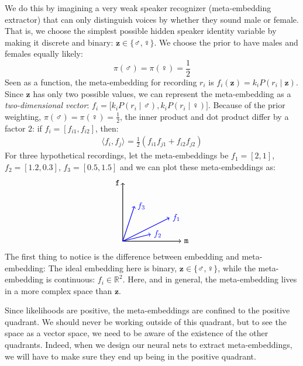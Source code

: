 \documentclass[a4paper,oneside,12pt,english]{report}
\def\zvec{\mathbf{z}}
\def\expv#1#2{\bigl\langle#1\bigr\rangle_{#2}}
\def\R{\mathbb{R}}
\def\dot#1#2{\expv{#1,#2}{}}
\begin{document}
We do this by imagining a very weak speaker recognizer (meta-embedding extractor) that can only distinguish voices by whether they sound male or female. That is, we choose the simplest possible hidden speaker identity variable by making it discrete and binary: $\zvec\in\{\male,\female\}$. We choose the prior to have males and females equally likely:  
$$\pi(\male)=\pi(\female)=\frac12$$ 
Seen as a function, the meta-embedding for recording $r_i$ is $f_i(\zvec) = k_i P(r_i\mid\zvec)$. Since $\zvec$ has only two possible values, we can represent the meta-embedding as a \emph{two-dimensional vector}: $f_i = \bigl[k_iP(r_i\mid\male),k_iP(r_i\mid\female)\bigr]$. Because of the prior weighting, $\pi(\male)=\pi(\female)=\frac12$, the inner product and dot product differ by a factor $2$: if $f_i=[f_{i1},f_{i2}]$, then:
\begin{align}
\dot{f_i}{f_j} = \frac12(f_{i1}f_{j1} + f_{i2}f_{j2})
\end{align}
For three hypothetical recordings, let the meta-embeddings be $f_1=[2,1]$, $f_2=[1.2,0.3]$, $f_3=[0.5,1.5]$ and we can plot these meta-embeddings as:
$$
\begin{tikzpicture}[xscale=1,yscale=1,thick]

\draw[->] (0,0) -- (0,2.5) node[left]{$\female$};
\draw[->] (0,0) -- (2.5,0) node[right]{$\male$};

\draw[->,blue] (0,0) -- (2,1) node[right]{$f_1$};
\draw[->,blue] (0,0) -- (1.2,0.3) node[right]{$f_2$};
\draw[->,blue] (0,0) -- (0.5,1.5) node[right]{$f_3$};
\end{tikzpicture}
$$
The first thing to notice is the difference between embedding and meta-embedding: The ideal embedding here is binary, $\zvec\in\{\male,\female\}$, while the meta-embedding is continuous: $f_i\in\R^2$. Here, and in general, the meta-embedding lives in a more complex space than $\zvec$. 

Since likelihoods are positive, the meta-embeddings are confined to the positive quadrant. We should never be working outside of this quadrant, but to see the space as a vector space, we need to be aware of the existence of the other quadrants. Indeed, when we design our neural nets to extract meta-embeddings, we will have to make sure they end up being in the positive quadrant. 
\end{document}
